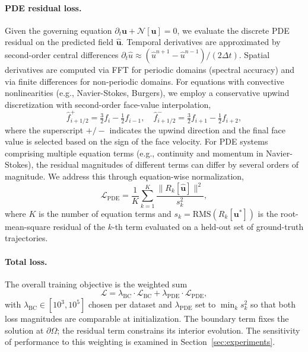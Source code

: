 \documentclass{article}
\begin{document}
\paragraph{PDE residual loss.}
Given the governing equation $\partial_t \mathbf{u} + \mathcal{N}[\mathbf{u}] = 0$, we evaluate the discrete PDE residual on the predicted field $\hat{\mathbf{u}}$. Temporal derivatives are approximated by second-order central differences $\partial_t \hat{u} \approx (\hat{u}^{n+1} - \hat{u}^{n-1}) / (2\Delta t)$. Spatial derivatives are computed via FFT for periodic domains (spectral accuracy) and via finite differences for non-periodic domains. For equations with convective nonlinearities (e.g., Navier-Stokes, Burgers), we employ a conservative upwind discretization with second-order face-value interpolation,
\begin{equation}
\hat{f}_{i+1/2}^{+} = \tfrac{3}{2} f_i - \tfrac{1}{2} f_{i-1}, \quad
\hat{f}_{i+1/2}^{-} = \tfrac{3}{2} f_{i+1} - \tfrac{1}{2} f_{i+2},
\end{equation}
where the superscript $+/-$ indicates the upwind direction and the final face value is selected based on the sign of the face velocity. For PDE systems comprising multiple equation terms (e.g., continuity and momentum in Navier-Stokes), the residual magnitudes of different terms can differ by several orders of magnitude. We address this through equation-wise normalization,
\begin{equation}
\mathcal{L}_{\mathrm{PDE}} = \frac{1}{K} \sum_{k=1}^{K} \frac{\|R_k[\hat{\mathbf{u}}]\|^2}{s_k^2},
\end{equation}
where $K$ is the number of equation terms and $s_k = \mathrm{RMS}(R_k[\mathbf{u}^*])$ is the root-mean-square residual of the $k$-th term evaluated on a held-out set of ground-truth trajectories.

\paragraph{Total loss.}
The overall training objective is the weighted sum
\begin{equation}
\mathcal{L} = \lambda_{\mathrm{BC}} \cdot \mathcal{L}_{\mathrm{BC}} + \lambda_{\mathrm{PDE}} \cdot \mathcal{L}_{\mathrm{PDE}},
\end{equation}
with $\lambda_{\mathrm{BC}} \in [10^3, 10^5]$ chosen per dataset and $\lambda_{\mathrm{PDE}}$ set to $\min_k s_k^2$ so that both loss magnitudes are comparable at initialization. The boundary term fixes the solution at $\partial\Omega$; the residual term constrains its interior evolution. The sensitivity of performance to this weighting is examined in Section~\ref{sec:experiments}.
\end{document}
